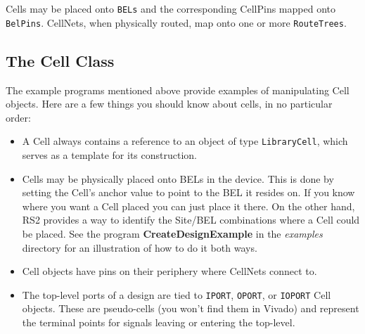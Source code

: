 \documentclass[12pt]{article}
\newcommand{\cls}[1]{{\texttt{#1}}}
\newcommand{\pgm}[1]{{\textbf{#1}}}
\newcommand{\dir}[1]{{\em #1}}
\begin{document}
Cells may be placed onto \cls{BELs} and the corresponding CellPins mapped onto
\cls{BelPins}.  CellNets, when physically routed, map onto one or more
\cls{RouteTrees}.

\subsection{The Cell Class}
The example programs mentioned above provide examples of manipulating Cell
objects.  Here are a few things you should know about cells, in no particular
order: 
\begin{itemize}
\item A Cell always contains a reference to an object of type \cls{LibraryCell},
which serves as a template for its construction.
\item Cells may be physically  placed onto BELs in the device.  This is done by
setting the Cell's anchor value to point to the BEL it resides on.  If you know
where you want a Cell placed you can just place it there.  On the other hand,
RS2 provides a way to identify the Site/BEL combinations where a Cell could be
placed.  See the program \pgm{CreateDesignExample} in the \dir{examples}
directory for an illustration of how to do it both ways.
\item Cell objects have pins on their periphery where CellNets connect to.
\item The top-level ports of a design are tied to \cls{IPORT}, \cls{OPORT}, or
\cls{IOPORT} Cell objects.  These are pseudo-cells (you won't find them in
Vivado) and represent the terminal points for signals leaving or entering the top-level.  
\end{itemize}
\end{document}
